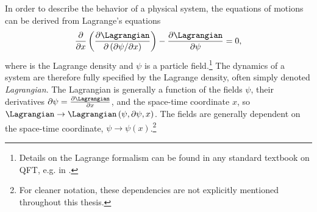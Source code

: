 In order to describe the behavior of a physical system, the equations of motions can be derived from Lagrange's equations
\begin{equation}
  \label{eq:euler-lagrange}
  \frac{\partial}{\partial x} \left( \frac{\partial \Lagrangian}{\partial \left(\partial \psi / \partial x \right) } \right) - \frac{\partial \Lagrangian}{\partial \psi} = 0,
\end{equation}
where \Lagrangian is the Lagrange density and $\psi$ is a particle field.\footnote{Details on the Lagrange formalism can be found in any standard textbook on QFT, e.g. in .}
The dynamics of a system are therefore fully specified by the Lagrange density, often simply denoted \emph{Lagrangian}.
The Lagrangian is generally a function of the fields $\psi$, their derivatives $\partial \psi = \frac{\partial \Lagrangian}{\partial x}$, and the space-time coordinate $x$, so $\Lagrangian \to \Lagrangian \left( \psi, \partial \psi, x \right)$.
The fields are generally dependent on the space-time coordinate, $\psi \rightarrow \psi(x)$.\footnote{For cleaner notation, these dependencies are not explicitly mentioned throughout this thesis.}

